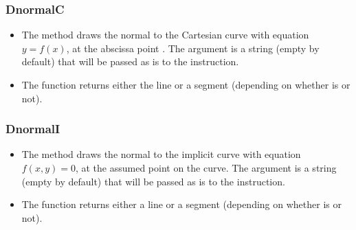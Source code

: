\subsubsection{DnormalC}
\begin{itemize}
    \item The  method draws the normal to the Cartesian curve with equation \(y=f(x)\), at the abscissa point . \arguLong{} The argument  is a string (empty by default) that will be passed as is to the \drawcmd instruction.
    \item The function  returns either the line or a segment (depending on whether  is \nil or not).
\end{itemize}

\subsubsection{DnormalI}
\begin{itemize}
    \item The  method draws the normal to the implicit curve with equation \(f(x,y)=0\), at the assumed point  on the curve. \arguLong{} The  argument is a string (empty by default) that will be passed as is to the \drawcmd instruction.
    \item The function  returns either a line or a segment (depending on whether  is \nil or not).
\end{itemize}

